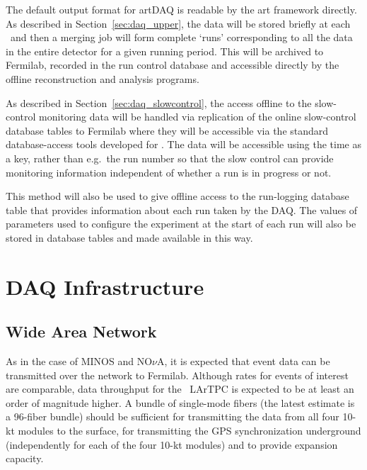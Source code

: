 The default output format for artDAQ is readable by the art framework
directly.  As described in Section~\ref{sec:daq_upper}, the data will be
stored briefly at each \COMPARTMENT\ and then a merging job will form
complete `runs' corresponding to all the data in the entire detector
for a given running period.  This will be archived to Fermilab, recorded in the
run control database and accessible directly by the offline
reconstruction and analysis programs.

As described in Section~\ref{sec:daq_slowcontrol}, the access offline
to the slow-control monitoring data will be handled via replication of
the online slow-control database tables to Fermilab where they will be
accessible via the standard database-access tools developed for \LBNE.
The data will be accessible using the time as a key, rather than e.g.\
the run number so that the slow control can provide monitoring
information independent of whether a run is in progress or not.

This method will also be used to give offline access to the
run-logging database table that provides information about each run
taken by the DAQ.  The values of parameters used to configure the
experiment at the start of each run will also be stored in database
tables and made available in this way.

\section{DAQ Infrastructure }
\label{sec:daq_infrastructure}

\subsection{Wide Area Network}

As in the case of MINOS and NO$\nu$A, it is expected that event data
can be transmitted over the network to Fermilab.  Although rates for
events of interest are comparable, data throughput for the \LBNE\
LArTPC is expected to be at least an order of magnitude higher.  A
bundle of single-mode fibers (the latest estimate is a 96-fiber bundle)
should be sufficient for transmitting the data from all four 10-kt
modules to the surface, for transmitting the GPS synchronization
underground (independently for each of the four 10-kt modules) and to provide
expansion capacity.

